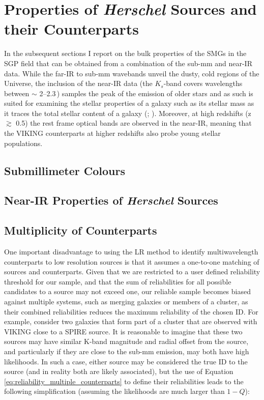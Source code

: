 \section{Properties of \textit{Herschel} Sources and their Counterparts}

In the subsequent sections I report on the bulk properties of the SMGs in the SGP field that can be obtained from a combination of the sub-mm and near-IR data. While the far-IR to sub-mm wavebands unveil the dusty, cold regions of the Universe, the inclusion of the near-IR data (the $K_s$-band covers wavelengths between $\sim$ 2--2.3\,\micron) samples the peak of the emission of older stars and as such is suited for examining the stellar properties of a galaxy such as its stellar mass as it traces the total stellar content of a galaxy (\citealt{Cole_2001}; \citealt{Bell_2003}). Moreover, at high redshifts (z $\gtrsim$ 0.5) the rest frame optical bands are observed in the near-IR, meaning that the VIKING counterparts at higher redshifts also probe young stellar populations.

\subsection{Submillimeter Colours}
\subsection{Near-IR Properties of \textit{Herschel} Sources}

\subsection{Multiplicity of Counterparts}
One important disadvantage to using the LR method to identify multiwavelength counterparts to low resolution sources is that it assumes a one-to-one matching of sources and counterparts. Given that we are restricted to a user defined reliability threshold for our sample, and that the sum of reliabilities for all possible candidates to a source may not exceed one, our reliable sample becomes biased against multiple systems, such as merging galaxies or members of a cluster, as their combined reliabilities reduces the maximum reliability of the chosen ID. For example, consider two galaxies that form part of a cluster that are observed with VIKING close to a SPIRE source. It is reasonable to imagine that these two sources may have similar K-band magnitude and radial offset from the source, and particularly if they are close to the sub-mm emission, may both have high likelihoods. In such a case, either source may be considered the true ID to the source (and in reality both are likely associated), but the use of Equation \ref{eq:reliability_multiple_counterparts} to define their reliabilities leads to the following simplification (assuming the likelihoods are much larger than $1-Q$):

